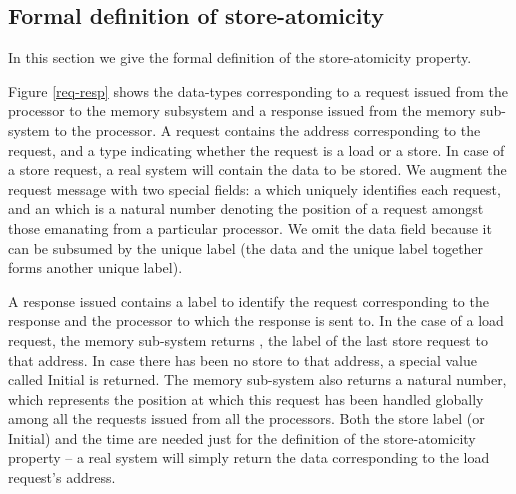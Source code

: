 \subsection{Formal definition of store-atomicity}
In this section we give the formal definition of the store-atomicity property.

Figure \ref{req-resp} shows the data-types corresponding to a request issued
from the processor to the memory subsystem and a response issued from the
memory sub-system to the processor. A request contains the
address corresponding to the request, and a type indicating whether the request
is a load or a store. In case of a store request, a real system will contain the
data to be stored. We augment the request message with two special fields: a
\mylabel which uniquely identifies each request, and an \myindex which
is a natural number denoting the position of a request amongst those emanating
from a particular processor. We omit the data field because it can be subsumed
by the unique label (the data and the unique label together forms another
unique label).

A response issued contains a label to identify the request corresponding to the
response and the processor to which the response is sent to. In the case of a
load request, the memory sub-system returns \stl, the label of the last store
request to that address. In case there has been no store to that address, a
special value called Initial is returned. The memory sub-system also returns a
natural number, \mytime which represents the position at which this request has
been handled globally among all the requests issued from all the processors.
Both the store label (or Initial) and the time are needed just for the
definition of the store-atomicity property -- a real system will simply return
the data corresponding to the load request's address.


